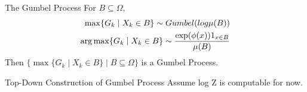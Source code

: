 
\begin{frame}{The Gumbel Process}
  For $B \subseteq \Omega$,
  \begin{align*}
    \max \{G_k \mid X_k \in B\} \sim Gumbel(log \mu(B)) \\
    \operatorname*{{arg\,max}} \{G_k \mid X_k \in B\} \sim \frac{\exp(\phi(x))1_{x \in B}}{\mu(B)} \\
  \end{align*}
  Then $\{ \max \{G_k \mid X_k \in B\} \mid B \subseteq \Omega\}$ is a Gumbel Process.
\end{frame}


\begin{frame}{Top-Down Construction of Gumbel Process}
  Assume log Z is computable for now.
\end{frame}

